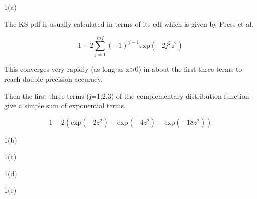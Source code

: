 
\begin{subsection}{1(a)}
  


The KS pdf is usually calculated in terms of its cdf which is given by Press et al.

\begin{equation}
  1-2\sum_{j=1}^{inf}(-1)^{j-1}\text{exp}(-2j^2z^2)
\end{equation}

This converges very rapidly (as long as z>0) in about the first three terms to reach double precision accuracy.

Then the first three terms (j=1,2,3) of the complementary distribution function give a simple sum of exponential terms.

\begin{equation}
  1-2\left( \text{exp}(-2z^2) - \text{exp}(-4z^2) + \text{exp}(-18z^2)\right)
\end{equation}

\end{subsection}



\begin{subsection}{1(b)}
  



\end{subsection}



\begin{subsection}{1(c)}
  



\end{subsection}



\begin{subsection}{1(d)}
  



\end{subsection}


\begin{subsection}{1(e)}
  



\end{subsection}
